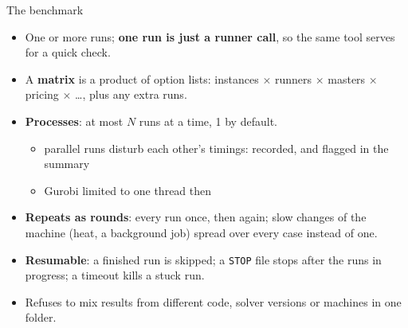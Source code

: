 \documentclass[aspectratio=169]{beamer}
\begin{document}
\begin{frame}{The benchmark}
  \begin{itemize}
    \item One or more runs; \textbf{one run is just a runner call}, so the same tool serves for a quick check.
    \item A \textbf{matrix} is a product of option lists: instances $\times$ runners $\times$ masters $\times$
      pricing $\times$ \ldots, plus any extra runs.
    \item \textbf{Processes}: at most $N$ runs at a time, 1 by default.
      \begin{itemize}\small
        \item parallel runs disturb each other's timings: recorded, and flagged in the summary
        \item Gurobi limited to one thread then
      \end{itemize}
    \item \textbf{Repeats as rounds}: every run once, then again; slow changes of the machine (heat, a background
      job) spread over every case instead of one.
    \item \textbf{Resumable}: a finished run is skipped; a \texttt{STOP} file stops after the runs in progress;
      a timeout kills a stuck run.
    \item Refuses to mix results from different code, solver versions or machines in one folder.
  \end{itemize}
\end{frame}
\end{document}
